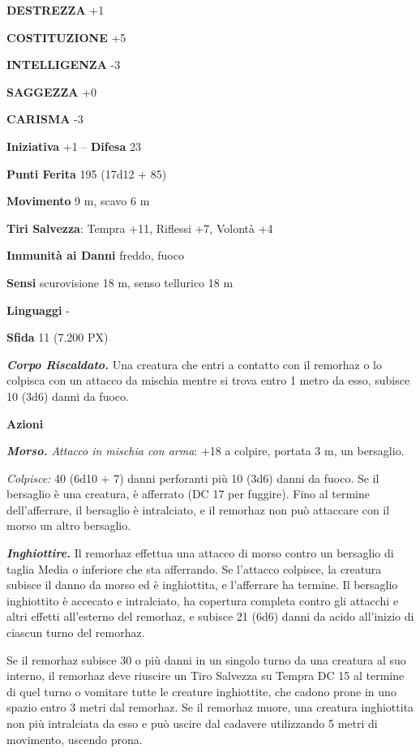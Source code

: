 \begin{multicols}{2}
\textbf{DESTREZZA} +1

\textbf{COSTITUZIONE} +5

\textbf{INTELLIGENZA} -3

\textbf{SAGGEZZA} +0

\textbf{CARISMA} -3

\textbf{Iniziativa} +1 -- \textbf{Difesa} 23

\textbf{Punti Ferita} 195 (17d12 + 85)

\textbf{Movimento} 9 m, scavo 6 m

\textbf{Tiri Salvezza}: Tempra +11, Riflessi +7, Volontà +4

\textbf{Immunità ai Danni} freddo, fuoco

\textbf{Sensi} scurovisione 18 m, senso tellurico 18 m

\textbf{Linguaggi} -

\textbf{Sfida} 11 (7.200 PX)

\textit{\textbf{Corpo Riscaldato.}} Una creatura che entri a contatto con il remorhaz o lo colpisca con un attacco da mischia mentre si trova entro 1 metro da esso, subisce 10 (3d6) danni da fuoco.

\textbf{Azioni}

\textit{\textbf{Morso.} Attacco in mischia con arma}: +18 a colpire, portata 3 m, un bersaglio.

\textit{Colpisce:} 40 (6d10 + 7) danni perforanti più 10 (3d6) danni da fuoco. Se il bersaglio è una creatura, è afferrato (DC 17 per fuggire). Fino al termine dell'afferrare, il bersaglio è intralciato, e il remorhaz non può attaccare con il morso un altro bersaglio.

\textit{\textbf{Inghiottire.}} Il remorhaz effettua una attacco di morso contro un bersaglio di taglia Media o inferiore che sta afferrando. Se l'attacco colpisce, la creatura subisce il danno da morso ed è inghiottita, e l'afferrare ha termine. Il bersaglio inghiottito è accecato e intralciato, ha copertura completa contro gli attacchi e altri effetti all'esterno del remorhaz, e subisce 21 (6d6) danni da acido all'inizio di ciascun turno del remorhaz.

Se il remorhaz subisce 30 o più danni in un singolo turno da una creatura al suo interno, il remorhaz deve riuscire un Tiro Salvezza su Tempra DC 15 al termine di quel turno o vomitare tutte le creature inghiottite, che cadono prone in uno spazio entro 3 metri dal remorhaz. Se il remorhaz muore, una creatura inghiottita non  più intralciata da esso e può uscire dal cadavere utilizzando 5 metri di movimento, uscendo prona.


\end{multicols}
